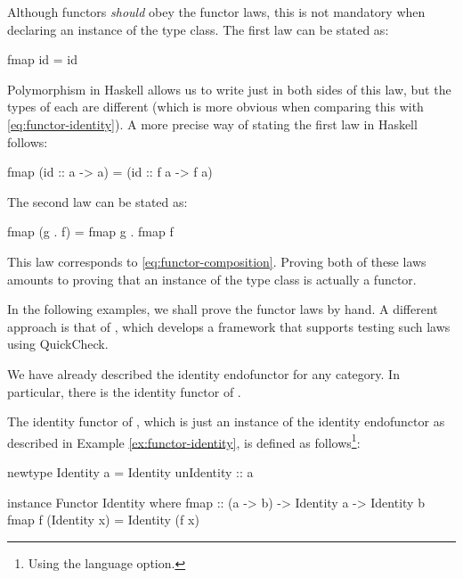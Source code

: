 Although functors \emph{should} obey the functor laws, this is not
mandatory when declaring an instance of the  type
class. The first law can be stated as:
\begin{codehaskell}
fmap id = id
\end{codehaskell}
Polymorphism in Haskell allows us to write just  in
both sides of this law, but the types of each  are
different (which is more obvious when comparing this with
\eqref{eq:functor-identity}). A more precise way of stating the first
law in Haskell follows:
\begin{codehaskell}
fmap (id :: a -> a) = (id :: f a -> f a)
\end{codehaskell}
The second law can be stated as:
\begin{codehaskell}
fmap (g . f) = fmap g . fmap f
\end{codehaskell}
This law corresponds to \eqref{eq:functor-composition}. Proving both
of these laws amounts to proving that an instance of the
 type class is actually a functor.

\begin{remark}

  In the following examples, we shall prove the functor laws by hand.
  A different approach is that of \parencite{jeuring-et-al-2012},
  which develops a framework that supports testing such laws using
  QuickCheck.

\end{remark}

We have already described the identity endofunctor for any category.
In particular, there is the identity functor of \hask.

\begin{example}
  \label{ex:functor-identity-haskell}

  The identity functor of \hask, which is just an instance of the
  identity endofunctor as described in Example
  \ref{ex:functor-identity}, is defined as follows\footnote{Using the
     language option.}:
  \begin{codehaskell}
newtype Identity a = Identity {unIdentity :: a}

instance Functor Identity where
  fmap :: (a -> b) -> Identity a -> Identity b
  fmap f (Identity x) = Identity (f x)
  \end{codehaskell}


\end{example}

